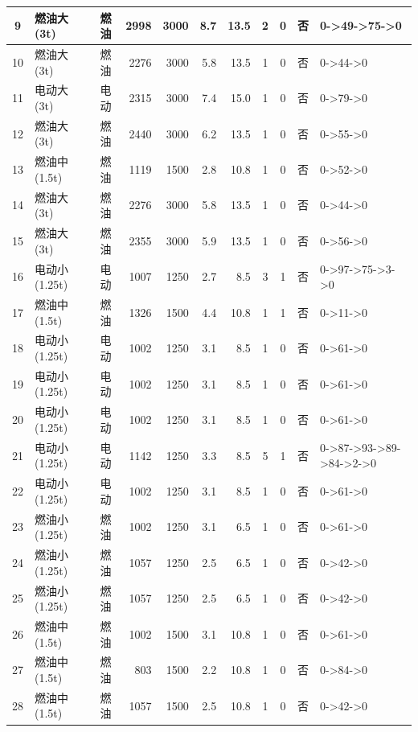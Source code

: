 \begin{landscape}
\begin{longtable}{|c|l|c|r|r|r|r|c|c|c|p{2.8cm}|}
\hline
\rowcolor{gray!8}
9 & 燃油大(3t) & 燃油 & 2998 & 3000 & 8.7 & 13.5 & 2 & 0 & 否 & 0->49->75->0 \\
\hline
10 & 燃油大(3t) & 燃油 & 2276 & 3000 & 5.8 & 13.5 & 1 & 0 & 否 & 0->44->0 \\
\hline
\rowcolor{gray!8}
11 & 电动大(3t) & 电动 & 2315 & 3000 & 7.4 & 15.0 & 1 & 0 & 否 & 0->79->0 \\
\hline
12 & 燃油大(3t) & 燃油 & 2440 & 3000 & 6.2 & 13.5 & 1 & 0 & 否 & 0->55->0 \\
\hline
\rowcolor{gray!8}
13 & 燃油中(1.5t) & 燃油 & 1119 & 1500 & 2.8 & 10.8 & 1 & 0 & 否 & 0->52->0 \\
\hline
14 & 燃油大(3t) & 燃油 & 2276 & 3000 & 5.8 & 13.5 & 1 & 0 & 否 & 0->44->0 \\
\hline
\rowcolor{gray!8}
15 & 燃油大(3t) & 燃油 & 2355 & 3000 & 5.9 & 13.5 & 1 & 0 & 否 & 0->56->0 \\
\hline
16 & 电动小(1.25t) & 电动 & 1007 & 1250 & 2.7 & 8.5 & 3 & 1 & 否 & 0->97->75->3->0 \\
\hline
\rowcolor{gray!8}
17 & 燃油中(1.5t) & 燃油 & 1326 & 1500 & 4.4 & 10.8 & 1 & 1 & 否 & 0->11->0 \\
\hline
18 & 电动小(1.25t) & 电动 & 1002 & 1250 & 3.1 & 8.5 & 1 & 0 & 否 & 0->61->0 \\
\hline
\rowcolor{gray!8}
19 & 电动小(1.25t) & 电动 & 1002 & 1250 & 3.1 & 8.5 & 1 & 0 & 否 & 0->61->0 \\
\hline
20 & 电动小(1.25t) & 电动 & 1002 & 1250 & 3.1 & 8.5 & 1 & 0 & 否 & 0->61->0 \\
\hline
\rowcolor{gray!8}
21 & 电动小(1.25t) & 电动 & 1142 & 1250 & 3.3 & 8.5 & 5 & 1 & 否 & 0->87->93->89->84->2->0 \\
\hline
22 & 电动小(1.25t) & 电动 & 1002 & 1250 & 3.1 & 8.5 & 1 & 0 & 否 & 0->61->0 \\
\hline
\rowcolor{gray!8}
23 & 燃油小(1.25t) & 燃油 & 1002 & 1250 & 3.1 & 6.5 & 1 & 0 & 否 & 0->61->0 \\
\hline
24 & 燃油小(1.25t) & 燃油 & 1057 & 1250 & 2.5 & 6.5 & 1 & 0 & 否 & 0->42->0 \\
\hline
\rowcolor{gray!8}
25 & 燃油小(1.25t) & 燃油 & 1057 & 1250 & 2.5 & 6.5 & 1 & 0 & 否 & 0->42->0 \\
\hline
26 & 燃油中(1.5t) & 燃油 & 1002 & 1500 & 3.1 & 10.8 & 1 & 0 & 否 & 0->61->0 \\
\hline
\rowcolor{gray!8}
27 & 燃油中(1.5t) & 燃油 & 803 & 1500 & 2.2 & 10.8 & 1 & 0 & 否 & 0->84->0 \\
\hline
28 & 燃油中(1.5t) & 燃油 & 1057 & 1500 & 2.5 & 10.8 & 1 & 0 & 否 & 0->42->0 \\

\end{longtable}
\end{landscape}

